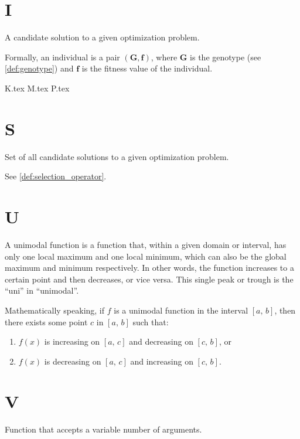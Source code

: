   \section*{I}
    \begin{definition}[Individual]
    \label{def:individual}
      A candidate solution to a given optimization problem.

      Formally, an individual is a pair \((\mathbf{G}, \mathbf{f})\), where \(\mathbf{G}\) is the
      genotype (see \vref{def:genotype}) and \(\mathbf{f}\) is the fitness value of the
      individual.
    \end{definition}
    
  {K.tex}
  {M.tex}
  {P.tex}

  \section*{S}
    \begin{definition}
    \label{def:search_space}
      Set of all candidate solutions to a given optimization problem.
    \end{definition}

    \begin{definition}[Selector]
      See \vref{def:selection_operator}.
    \end{definition}

  \section*{U}
    \begin{definition}
    \label{def:unimodal_function}
      A unimodal function is a function that, within a given domain or interval,
      has only one local maximum and one local minimum, which can also be the
      global maximum and minimum respectively.
      In other words, the function increases to a certain point and then 
      decreases, or vice versa.
      This single peak or trough is the \enquote{uni} in \enquote{unimodal}.

      Mathematically speaking, if \(f\) is a unimodal function in the interval 
      \([a,\, b]\), then there exists some point \(c\) in \([a,\, b]\) such 
      that:

      \begin{enumerate}
        \item \(f(x)\) is increasing on \([a,\, c]\) and decreasing on \([c,\, 
          b]\), or
        \item \(f(x)\) is decreasing on \([a,\, c]\) and increasing on \([c,\,
          b]\).
      \end{enumerate}
    \end{definition}

  \section*{V}
    \begin{definition}
    \label{def:variadic_function}
      Function that accepts a variable number of arguments.
    \end{definition}
